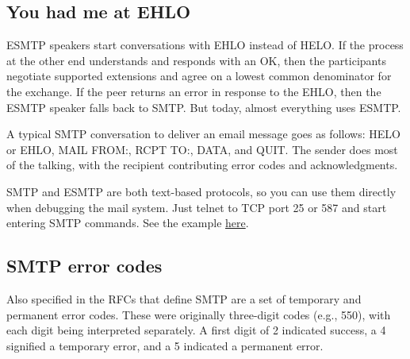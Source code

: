 
\protect\hypertarget{part0026_split_010.html}{}{}

\hypertarget{part0026_split_010.htmlux5cux23_idContainer1247}{}
\hypertarget{part0026_split_010.htmlux5cux23calibre_pb_9}{%
\subsection[You had me at
EHLO]{\texorpdfstring{\protect\hypertarget{part0026_split_010.htmlux5cux23_idTextAnchor1014}{}{}You
had me at
EHLO}{You had me at EHLO}}\label{part0026_split_010.htmlux5cux23calibre_pb_9}}

ESMTP speakers start conversations with EHLO instead of HELO. If the
process at the other end understands and responds with an OK, then the
participants negotiate supported extensions and agree on a lowest common
denominator for the exchange. If the peer returns an error in response
to the EHLO, then the ESMTP speaker falls back to SMTP. But today,
almost everything uses ESMTP.

A typical SMTP conversation to deliver an email message goes as follows:
HELO or EHLO, MAIL FROM:, RCPT TO:, DATA, and QUIT. The sender does most
of the talking, with the recipient contributing error codes and
acknowledgments.

\protect\hypertarget{part0026_split_010.htmlux5cux23_idIndexMarker2432}{}{}\protect\hypertarget{part0026_split_010.htmlux5cux23_idIndexMarker2433}{}{}SMTP
and ESMTP are both text-based protocols, so you can use them directly
when debugging the mail system. Just {telnet} to TCP port 25 or 587 and
start entering SMTP commands. See the example
\protect\hyperlink{part0026_split_012.htmlux5cux23_idTextAnchor1019}{here}.

\protect\hypertarget{part0026_split_011.html}{}{}

\hypertarget{part0026_split_011.htmlux5cux23_idContainer1247}{}
\hypertarget{part0026_split_011.htmlux5cux23calibre_pb_10}{%
\subsection[SMTP error
codes]{\texorpdfstring{\protect\hypertarget{part0026_split_011.htmlux5cux23_idTextAnchor1015}{}{}SMTP
error
codes}{SMTP error codes}}\label{part0026_split_011.htmlux5cux23calibre_pb_10}}

\protect\hypertarget{part0026_split_011.htmlux5cux23_idIndexMarker2434}{}{}Also
specified in the RFCs that define SMTP are a set of temporary and
permanent error codes. These were originally three-digit codes (e.g.,
550), with each digit being interpreted separately. A first digit of 2
indicated success, a 4 signified a temporary error, and a 5 indicated a
permanent error.

